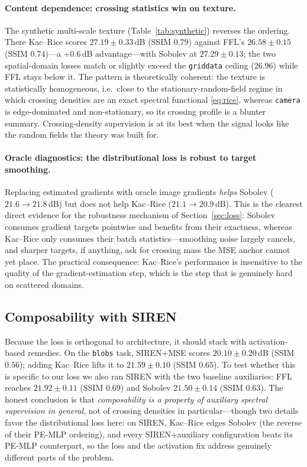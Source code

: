\documentclass[10pt]{article}
\begin{document}
\paragraph{Content dependence: crossing statistics win on texture.}
The synthetic multi-scale texture (Table~\ref{tab:synthetic}) reverses the ordering.
There Kac--Rice scores $27.19\pm0.33$\,dB (SSIM $0.79$) against FFL's $26.58\pm0.15$
(SSIM $0.74$)---a $+0.6$\,dB advantage---with Sobolev at $27.29\pm0.13$; the two
spatial-domain losses match or slightly exceed the \texttt{griddata} ceiling
($26.96$) while FFL stays below it. The pattern is theoretically coherent: the
texture is statistically homogeneous, i.e.\ close to the stationary-random-field
regime in which crossing densities are an exact spectral functional
\eqref{eq:rice}, whereas \texttt{camera} is edge-dominated and non-stationary, so its
crossing profile is a blunter summary. Crossing-density supervision is at its best
when the signal looks like the random fields the theory was built for.

\paragraph{Oracle diagnostics: the distributional loss is robust to target smoothing.}
Replacing estimated gradients with oracle image gradients \emph{helps} Sobolev
($21.6\to21.8$\,dB) but does not help Kac--Rice ($21.1\to20.9$\,dB). This is the
clearest direct evidence for the robustness mechanism of
Section~\ref{sec:loss}: Sobolev consumes gradient targets pointwise and benefits from
their exactness, whereas Kac--Rice only consumes their batch statistics---smoothing
noise largely cancels, and sharper targets, if anything, ask for crossing mass the
MSE anchor cannot yet place. The practical consequence: Kac--Rice's performance is
insensitive to the quality of the gradient-estimation step, which is the step that is
genuinely hard on scattered domains.

\subsection{Composability with SIREN}
\label{sec:composability}

Because the loss is orthogonal to architecture, it should stack with activation-based
remedies. On the \texttt{blobs} task, SIREN+MSE scores $20.10\pm0.20$\,dB (SSIM
$0.56$); adding Kac--Rice lifts it to $21.59\pm0.10$ (SSIM $0.65$). To test whether
this is specific to our loss we also ran SIREN with the two baseline auxiliaries: FFL
reaches $21.92\pm0.11$ (SSIM $0.69$) and Sobolev $21.50\pm0.14$ (SSIM $0.63$). The
honest conclusion is that \emph{composability is a property of auxiliary spectral
supervision in general}, not of crossing densities in particular---though two details
favor the distributional loss here: on SIREN, Kac--Rice edges Sobolev (the reverse of
their PE-MLP ordering), and every SIREN+auxiliary configuration beats its PE-MLP
counterpart, so the loss and the activation fix address genuinely different parts of
the problem.
\end{document}
